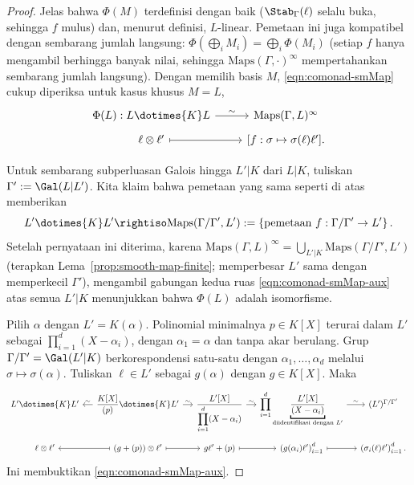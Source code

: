\begin{proof}
	Jelas bahwa $\Phi(M)$ terdefinisi dengan baik
	($\Stab_\Gamma(\ell)$ selalu buka, sehingga $f$ mulus) dan, menurut
	definisi, $L$-linear. Pemetaan ini juga kompatibel dengan sembarang jumlah
	langsung:
	$\Phi(\bigoplus_iM_i)=\bigoplus_i\Phi(M_i)$ (setiap $f$ hanya mengambil
	berhingga banyak nilai, sehingga
	$\mathrm{Maps}(\Gamma,\mathord\cdot)^\infty$ mempertahankan sembarang jumlah
	langsung). Dengan memilih basis $M$, \eqref{eqn:comonad-smMap} cukup
	diperiksa untuk kasus khusus $M=L$,
	\[\begin{tikzcd}[row sep=tiny]
		\Phi(L): L \dotimes{K} L \arrow[r, "\sim"] & \mathrm{Maps}(\Gamma, L)^\infty \\
		\ell \otimes \ell' \arrow[mapsto, r] & {[f: \sigma \mapsto \sigma(\ell)\ell' ]}.
	\end{tikzcd}\]

	Untuk sembarang subperluasan Galois hingga $L'|K$ dari $L|K$, tuliskan
	$\Gamma':=\Gal(L|L')$. Kita klaim bahwa pemetaan yang sama seperti di
	atas memberikan
	\begin{equation}\label{eqn:comonad-smMap-aux}
		L' \dotimes{K} L' \rightiso \mathrm{Maps}(\Gamma/\Gamma', L') := \left\{\text{pemetaan } f: \Gamma/\Gamma' \to L' \right\}.
	\end{equation}
	Setelah pernyataan ini diterima, karena
	$\mathrm{Maps}(\Gamma,L)^\infty=
	\bigcup_{L'|K}\mathrm{Maps}(\Gamma/\Gamma',L')$
	(terapkan Lema~\ref{prop:smooth-map-finite}; memperbesar $L'$ sama dengan
	memperkecil $\Gamma'$), mengambil gabungan kedua ruas
	\eqref{eqn:comonad-smMap-aux} atas semua $L'|K$ menunjukkan bahwa
	$\Phi(L)$ adalah isomorfisme.

	Pilih $\alpha$ dengan $L'=K(\alpha)$. Polinomial minimalnya
	$p\in K[X]$ terurai dalam $L'$ sebagai
	$\prod_{i=1}^d(X-\alpha_i)$, dengan $\alpha_1=\alpha$ dan tanpa akar
	berulang. Grup $\Gamma/\Gamma'=\Gal(L'|K)$ berkorespondensi satu-satu
	dengan $\alpha_1,\ldots,\alpha_d$ melalui
	$\sigma\mapsto\sigma(\alpha)$. Tuliskan $\ell\in L'$ sebagai $g(\alpha)$
	dengan $g\in K[X]$. Maka
	\[\begin{tikzcd}[row sep=tiny, column sep=small]
		L' \dotimes{K} L' & \dfrac{K[X]}{(p)} \dotimes{K} L' \arrow[l, "\sim"'] \arrow[r, "\sim"] & \dfrac{L'[X]}{\displaystyle\prod_{i=1}^d (X - \alpha_i)} \arrow[r, "\sim"] & \displaystyle\prod_{i=1}^d \underbracket{\dfrac{L'[X]}{(X - \alpha_i)}}_{\text{diidentifikasi dengan } L'} \arrow[r, "\sim"] & (L')^{\Gamma/\Gamma'} \\
		\ell \otimes \ell' & (g + (p)) \otimes \ell' \arrow[mapsto, l] \arrow[mapsto, r] & g\ell' + (p) \arrow[mapsto, r] & \left( g(\alpha_i) \ell' \right)_{i=1}^d \arrow[mapsto, r] & \left( \sigma_i(\ell) \ell' \right)_{i=1}^d.
	\end{tikzcd}\]
	Ini membuktikan \eqref{eqn:comonad-smMap-aux}.
\end{proof}

